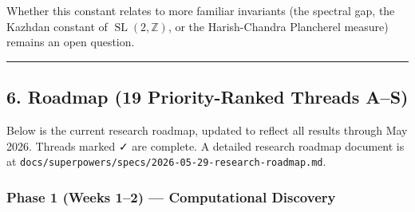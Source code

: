 \documentclass[
]{article}
\begin{document}
Whether this constant relates to more familiar invariants (the spectral
gap, the Kazhdan constant of \(\operatorname{SL}(2,\mathbb{Z})\), or the
Harish-Chandra Plancherel measure) remains an open question.

\begin{center}\rule{0.5\linewidth}{0.5pt}\end{center}

\hypertarget{roadmap-19-priority-ranked-threads-as}{%
\subsection{6. Roadmap (19 Priority-Ranked Threads
A--S)}\label{roadmap-19-priority-ranked-threads-as}}

Below is the current research roadmap, updated to reflect all results
through May 2026. Threads marked ✓ are complete. A detailed research
roadmap document is at
\texttt{docs/superpowers/specs/2026-05-29-research-roadmap.md}.

\hypertarget{phase-1-weeks-12-computational-discovery}{%
\subsubsection{Phase 1 (Weeks 1--2) --- Computational
Discovery}\label{phase-1-weeks-12-computational-discovery}}
\end{document}
